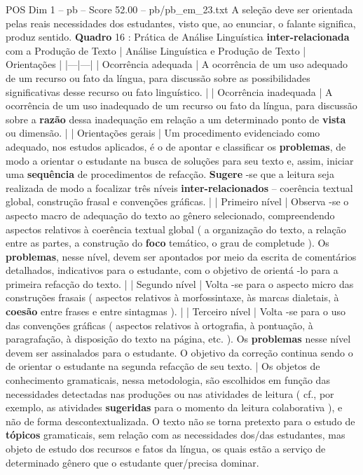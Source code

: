 \begin{textsample}{POS Dim 1 – pb – Score 52.00 – pb/pb\_em\_23.txt}
A seleção deve ser orientada pelas reais necessidades dos estudantes, visto que, ao enunciar, o falante significa, produz sentido. \textbf{Quadro} 16 : Prática de Análise Linguística \textbf{inter-relacionada} com a Produção de Texto | Análise Linguística e Produção de Texto | Orientações | |---|---| | Ocorrência adequada | A ocorrência de um uso adequado de um recurso ou fato da língua, para discussão sobre as possibilidades significativas desse recurso ou fato linguístico. | | Ocorrência inadequada | A ocorrência de um uso inadequado de um recurso ou fato da língua, para discussão sobre a \textbf{razão} dessa inadequação em relação a um determinado ponto de \textbf{vista} ou dimensão. | | Orientações gerais | Um procedimento evidenciado como adequado, nos estudos aplicados, é o de apontar e classificar os \textbf{problemas}, de modo a orientar o estudante na busca de soluções para seu texto e, assim, iniciar uma \textbf{sequência} de procedimentos de refacção. \textbf{Sugere} -se que a leitura seja realizada de modo a focalizar três níveis \textbf{inter-relacionados} – coerência textual global, construção frasal e convenções gráficas. | | Primeiro nível | Observa -se o aspecto macro de adequação do texto ao gênero selecionado, compreendendo aspectos relativos à coerência textual global ( a organização do texto, a relação entre as partes, a construção do \textbf{foco} temático, o grau de completude ).
Os \textbf{problemas}, nesse nível, devem ser apontados por meio da escrita de comentários detalhados, indicativos para o estudante, com o objetivo de orientá -lo para a primeira refacção do texto. | | Segundo nível | Volta -se para o aspecto micro das construções frasais ( aspectos relativos à morfossintaxe, às marcas dialetais, à \textbf{coesão} entre frases e entre sintagmas ). | | Terceiro nível | Volta -se para o uso das convenções gráficas ( aspectos relativos à ortografia, à pontuação, à paragrafação, à disposição do texto na página, etc. ).
Os \textbf{problemas} nesse nível devem ser assinalados para o estudante.
O objetivo da correção continua sendo o de orientar o estudante na segunda refacção de seu texto. | Os objetos de conhecimento gramaticais, nessa metodologia, são escolhidos em função das necessidades detectadas nas produções ou nas atividades de leitura ( cf., por exemplo, as atividades \textbf{sugeridas} para o momento da leitura colaborativa ), e não de forma descontextualizada.
O texto não se torna pretexto para o estudo de \textbf{tópicos} gramaticais, sem relação com as necessidades dos/das estudantes, mas objeto de estudo dos recursos e fatos da língua, os quais estão a serviço de determinado gênero que o estudante quer/precisa dominar.

\end{textsample}

